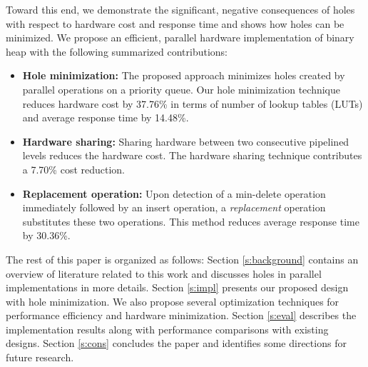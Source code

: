 Toward this end, we demonstrate the significant, negative consequences of holes with respect to hardware cost and response time and shows how holes can be minimized.
We propose an efficient, parallel hardware implementation of binary heap with the following summarized contributions: 
\begin{itemize}
\item {\bf Hole minimization:} The proposed approach minimizes holes created by parallel operations on a priority queue. Our hole minimization technique reduces hardware cost by 37.76\% in terms of number of lookup tables (LUTs) and average response time by 14.48\%.
\item {\bf Hardware sharing:} Sharing hardware between two consecutive pipelined levels reduces the hardware cost. The hardware sharing technique contributes a 7.70\% cost reduction.
\item {\bf Replacement operation:} Upon detection of a min-delete operation immediately followed by an insert operation, a {\it replacement} operation substitutes these two operations. This method reduces average response time by 30.36\%.
\end{itemize}

The rest of this paper is organized as follows:
Section \autoref{s:background} contains an overview of literature related to this work and discusses holes in parallel implementations in more details.
Section \autoref{s:impl} presents our proposed design with hole minimization. 
We also propose several optimization techniques for performance efficiency and hardware minimization.
Section \autoref{s:eval} describes the implementation results along with performance comparisons with existing designs.
Section \autoref{s:cons} concludes the paper and identifies some directions for future research.
